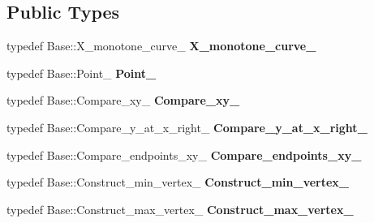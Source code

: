 \subsection*{Public Types}
\begin{DoxyCompactItemize}
\item 
\mbox{\label{class_c_g_a_l_1_1_gps__traits__adaptor_a5be94aa5ed91e2f18e6cfff5252d4c06}} 
typedef Base\+::\+X\+\_\+monotone\+\_\+curve\+\_ {\bfseries X\+\_\+monotone\+\_\+curve\+\_}
\item 
\mbox{\label{class_c_g_a_l_1_1_gps__traits__adaptor_a14633f0cc705da17baaa97fce14f07ab}} 
typedef Base\+::\+Point\+\_ {\bfseries Point\+\_}
\item 
\mbox{\label{class_c_g_a_l_1_1_gps__traits__adaptor_a68c21d39c14fbb75c26dc5d3304de56f}} 
typedef Base\+::\+Compare\+\_\+xy\+\_ {\bfseries Compare\+\_\+xy\+\_}
\item 
\mbox{\label{class_c_g_a_l_1_1_gps__traits__adaptor_ac1f84560945843b59947c63a60b1720c}} 
typedef Base\+::\+Compare\+\_\+y\+\_\+at\+\_\+x\+\_\+right\+\_ {\bfseries Compare\+\_\+y\+\_\+at\+\_\+x\+\_\+right\+\_}
\item 
\mbox{\label{class_c_g_a_l_1_1_gps__traits__adaptor_aa7452af636898d3fe205ee4369840c51}} 
typedef Base\+::\+Compare\+\_\+endpoints\+\_\+xy\+\_ {\bfseries Compare\+\_\+endpoints\+\_\+xy\+\_}
\item 
\mbox{\label{class_c_g_a_l_1_1_gps__traits__adaptor_a92b7892617e52da886803416758c8f50}} 
typedef Base\+::\+Construct\+\_\+min\+\_\+vertex\+\_ {\bfseries Construct\+\_\+min\+\_\+vertex\+\_}
\item 
\mbox{\label{class_c_g_a_l_1_1_gps__traits__adaptor_a180f8e3b846388e637139a1ac251244a}} 
typedef Base\+::\+Construct\+\_\+max\+\_\+vertex\+\_ {\bfseries Construct\+\_\+max\+\_\+vertex\+\_}
\end{DoxyCompactItemize}
